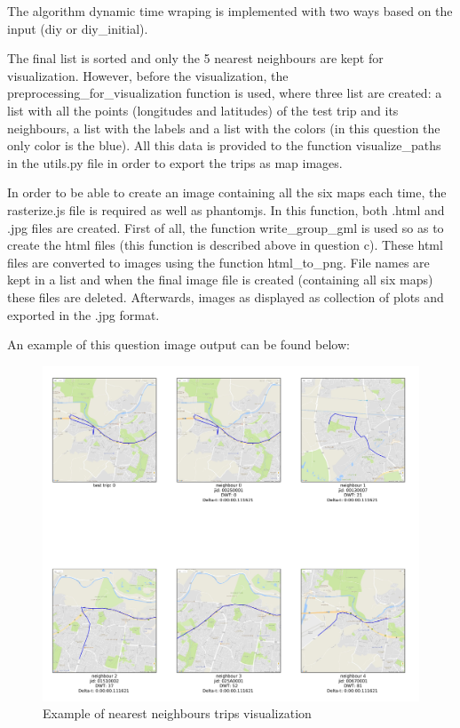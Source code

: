 \documentclass[12pt]{article}
\begin{document}
	The algorithm dynamic time wraping is implemented with two ways based on the input (diy or diy\_initial). 
	
	The final list is sorted and only the 5 nearest neighbours are kept for visualization. However, before the visualization, the preprocessing\_for\_visualization function is used, where three list are created: a list with all the points (longitudes and latitudes) of the test trip and its neighbours, a list with the labels and a list with the colors (in this question the only color is the blue). All this data is provided to the function visualize\_paths in the utils.py file in order to export the trips as map images.
	
	In order to be able to create an image containing all the six maps each time, the rasterize.js file is required as well as phantomjs. In this function, both .html and .jpg files are created. First of all, the function write\_group\_gml is used so as to create the html files (this function is described above in question c). These html files are converted to images using the function html\_to\_png. File names are kept in a list and when the final image file is created (containing all six maps) these files are deleted. Afterwards, images as displayed as collection of plots and exported in the .jpg format.
	
	An example of this question image output can be found below:
	
	\begin{figure} [H]
		\begin{center}
			\includegraphics [scale = 0.50] {question2a1example.jpg}
			\caption{Example of nearest neighbours trips visualization}
		\end{center}
	\end{figure} 
	
\end{document}
